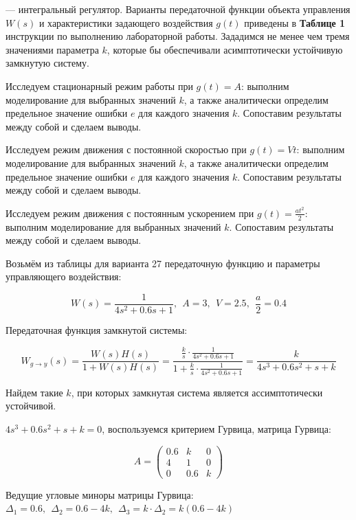 — интегральный регулятор. Варианты передаточной функции объекта управления $W(s)$ и характеристики задающего воздействия $g(t)$ приведены в  \textbf{Таблице 1 }инструкции по выполнению лабораторной работы. Зададимся не менее чем тремя значениями параметра $k$, которые бы обеспечивали асимптотически устойчивую замкнутую систему.


Исследуем стационарный режим работы при $g(t)=A$: выполним моделирование для выбранных значений $k$, а также аналитически определим предельное значение ошибки $e$ для каждого значения $k$. Сопоставим результаты между собой и сделаем выводы.


Исследуем режим движения с постоянной скоростью при $g(t)=Vt$: выполним моделирование для выбранных значений $k$, а также аналитически определим предельное значение ошибки $e$ для каждого значения $k$. Сопоставим результаты между собой и сделаем выводы.


Исследуем режим движения с постоянным ускорением при $g(t)=\frac{at^2 }{2}$: выполним моделирование для выбранных значений $k$. Сопоставим результаты между собой и сделаем выводы.




Возьмём из таблицы для варианта 27 передаточную функцию и параметры управляющего воздействия:

\begin{par}
$$W(s)=\frac{1}{4s^2 +0.6s+1},~~A=3,~~V=2.5,~~\frac{a}{2}=0.4$$
\end{par}


Передаточная функция замкнутой системы:

\begin{par}
$$W_{g\to y} (s)=\frac{W(s)H(s)}{1+W(s)H(s)}=\frac{\frac{k}{s}\cdot \frac{1}{4s^2 +0.6s+1}}{1+\frac{k}{s}\cdot \frac{1}{4s^2 +0.6s+1}}=\frac{k}{4s^3 +0.6s^2 +s+k}$$
\end{par}


Найдем такие $k$, при которых замкнутая система является ассимптотически устойчивой.


$4s^3 +0.6s^2 +s+k=0$, воспользуемся критерием Гурвица, матрица Гурвица:

\begin{par}
$$A=\left(\begin{array}{ccc}
0.6 & k & 0\\
4 & 1 & 0\\
0 & 0.6 & k
\end{array}\right)$$
\end{par}


Ведущие угловые миноры матрицы Гурвица: $\Delta_1 =0.6,~~\Delta_2 =0.6-4k,~~\Delta_3 =k\cdot \Delta_2 =k(0.6-4k)$



